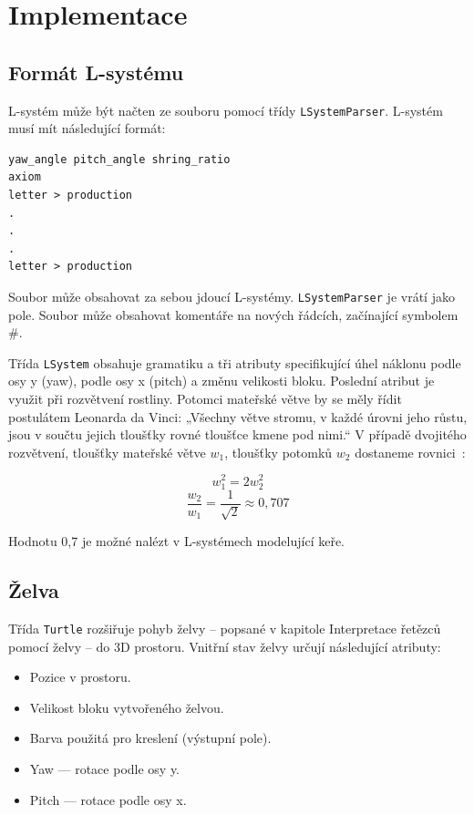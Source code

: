 \documentclass[thesis=M,czech]{FITthesis}[2019/12/23]
\begin{document}
\section{Implementace}
\subsection{Formát L-systému}

L-systém může být načten ze souboru pomocí třídy \texttt{LSystemParser}. L-systém musí mít následující formát:

\begin{verbatim}
yaw_angle pitch_angle shring_ratio
axiom
letter > production
.
.
.
letter > production
\end{verbatim}

Soubor může obsahovat za sebou jdoucí L-systémy. \texttt{LSystemParser} je vrátí jako pole. Soubor může obsahovat komentáře na nových řádcích, začínající symbolem \#.

Třída \texttt{LSystem} obsahuje gramatiku a tři atributy specifikující úhel náklonu podle osy y (yaw), podle osy x (pitch) a změnu velikosti bloku. Poslední atribut je využit při rozvětvení rostliny. Potomci mateřské větve by se měly řídit postulátem Leonarda da Vinci: „Všechny větve stromu, v každé úrovni jeho růstu, jsou v součtu jejich tloušťky rovné tloušťce kmene pod nimi.“ V případě dvojitého rozvětvení, tloušťky mateřské větve $w_1$, tloušťky potomků $w_2$ dostaneme rovnici~\cite{abop57}:

\[ w_1^2 = 2w_2^2 \]
\[ \frac{w_2}{w_1} = \frac{1}{\sqrt{2}} \approx 0,707\]

Hodnotu 0,7 je možné nalézt v L-systémech modelující keře.

\subsection{Želva}
Třída \texttt{Turtle} rozšiřuje pohyb želvy -- popsané v kapitole Interpretace řetězců pomocí želvy -- do 3D prostoru. Vnitřní stav želvy určují následující atributy:

\begin{itemize}
\item Pozice v prostoru.
\item Velikost bloku vytvořeného želvou.
\item Barva použitá pro kreslení (výstupní pole).
\item Yaw --- rotace podle osy y.
\item Pitch --- rotace podle osy x.
\end{itemize}
\end{document}

